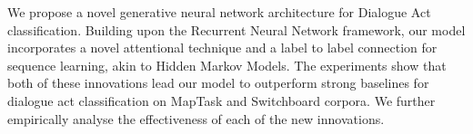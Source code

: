 We propose a novel generative neural network architecture for Dialogue Act classification. Building upon the Recurrent Neural Network framework, our model incorporates a novel attentional technique and a label to label connection for sequence learning, akin to Hidden Markov Models. The experiments show that both of these innovations lead  our model to outperform strong baselines for dialogue act classification on MapTask and Switchboard corpora. We further empirically analyse the effectiveness of each of the new innovations.
